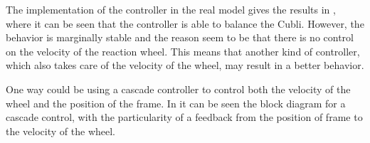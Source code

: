 The implementation of the controller in the real model gives the results in , where it can be seen that the controller is able to balance the Cubli. However, the behavior is marginally stable and the reason seem to be that there is no control on the velocity of the reaction wheel. This means that another kind of controller, which also takes care of the velocity of the wheel, may result in a better behavior.
%


One way could be using a cascade controller to control both the velocity of the wheel and the position of the frame. In  it can be seen the block diagram for a cascade control, with the particularity of a feedback from the position of frame to the velocity of the wheel.


